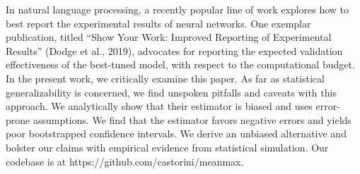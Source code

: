 In natural language processing, a recently popular line of work explores how to best report the experimental results of neural networks. One exemplar publication, titled ``Show Your Work: Improved Reporting of Experimental Results'' (Dodge et al., 2019), advocates for reporting the expected validation effectiveness of the best-tuned model, with respect to the computational budget. In the present work, we critically examine this paper. As far as statistical generalizability is concerned, we find unspoken pitfalls and caveats with this approach. We analytically show that their estimator is biased and uses error-prone assumptions. We find that the estimator favors negative errors and yields poor bootstrapped confidence intervals. We derive an unbiased alternative and bolster our claims with empirical evidence from statistical simulation. Our codebase is at https://github.com/castorini/meanmax.
